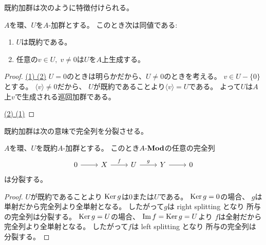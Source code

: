 \documentclass[report]{jlreq}
\begin{document}
既約加群は次のように特徴付けられる。

\begin{theorem}[既約加群の特徴付け]
    $A$を環、$U$を$A$-加群とする。
    このとき次は同値である:
    \begin{enumerate}
        \item $U$は既約である。
        \item 任意の$v \in U, \; v \neq 0$は$U$を$A$上生成する。
    \end{enumerate}
\end{theorem}

\begin{proof}
    \uline{(1) \Rightarrow (2)} \quad
    $U = 0$のときは明らかだから、$U \neq 0$のときを考える。
    $v \in U - \{ 0 \}$とする。
    $\langle v \rangle \neq 0$だから、
    $U$が既約であることより$\langle v \rangle = U$である。
    よって$U$は$A$上$v$で生成される巡回加群である。

    \uline{(2) \Rightarrow (1)} \quad
    \TODO{}
\end{proof}

既約加群は次の意味で完全列を分裂させる。

\begin{theorem}
    $A$を環、$U$を既約$A$-加群とする。
    このとき$A\text{-}\mathbf{Mod}$の任意の完全列
    \begin{equation}
        \begin{tikzcd}
            0
                \ar{r}
                & X
                    \ar{r}{f}
                & U
                    \ar{r}{g}
                & Y
                    \ar{r}
                & 0
        \end{tikzcd}
    \end{equation}
    は分裂する。
\end{theorem}

\begin{proof}
    $U$が既約であることより
    $\operatorname{\mathrm{Ker}} g$は$0$または$U$である。
    $\operatorname{\mathrm{Ker}} g = 0$の場合、
    $g$は単射だから完全列より全単射となる。
    したがって$g$は right splitting となり
    所与の完全列は分裂する。
    $\operatorname{\mathrm{Ker}} g = U$の場合、
    $\operatorname{\mathrm{Im}} f = \operatorname{\mathrm{Ker}} g = U$より
    $f$は全射だから完全列より全単射となる。
    したがって$f$は left splitting となり
    所与の完全列は分裂する。
\end{proof}

\end{document}
